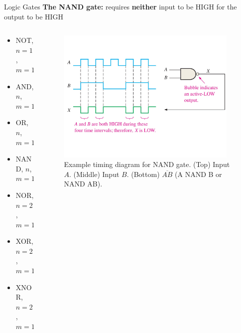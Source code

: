 \documentclass{beamer}
\begin{document}
\begin{frame}{Logic Gates}
\textbf{The NAND gate:} requires \textbf{neither} input to be HIGH for the output to be HIGH \\ \vspace{0.5cm}
\begin{columns}[T]
\begin{column}{0.5\textwidth}
\begin{itemize}
\item \alert{NOT, $n=1$, $m=1$}
\item \alert{AND, $n$, $m=1$}
\item \alert{OR, $n$, $m=1$}
\item \alert{NAND, $n$, $m=1$}
\item NOR, $n=2$, $m=1$
\item XOR, $n=2$, $m=1$
\item XNOR, $n=2$, $m=1$
\end{itemize}
\end{column}
\begin{column}{0.5\textwidth}
\begin{figure}
\centering
\includegraphics[width=0.95\textwidth,trim=0cm 4cm 0cm 4cm,clip=true]{figures/TimingNand.pdf}
\caption{\label{fig:nand2} Example timing diagram for NAND gate.  (Top) Input $A$.  (Middle) Input $B$. (Bottom) $\overline{AB}$ (A NAND B or NAND AB).}
\end{figure}
\end{column}
\end{columns}
\end{frame}
\end{document}
